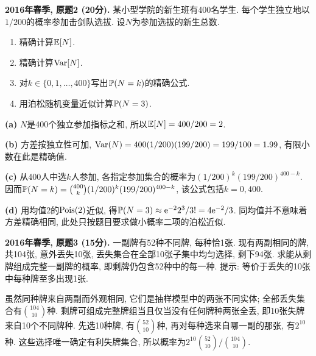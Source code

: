 \begin{exercise}\label{ex:m1-2016s-q2}
\textbf{2016年春季, 原题2 (20分).} 某小型学院的新生班有400名学生. 每个学生独立地以$1/200$的概率参加击剑队选拔. 设$N$为参加选拔的新生总数.
\begin{enumerate}\item[(a)]\label{ex:m1-2016s-q2-a} 精确计算$\mathbb E[N]$.\item[(b)]\label{ex:m1-2016s-q2-b} 精确计算$\operatorname{Var}[N]$.\item[(c)]\label{ex:m1-2016s-q2-c} 对$k\in\{0,1,\ldots,400\}$写出$\mathbb P(N=k)$的精确公式.\item[(d)]\label{ex:m1-2016s-q2-d} 用泊松随机变量近似计算$\mathbb P(N=3)$.\end{enumerate}
\end{exercise}
\begin{solution}
\textbf{(a)}\label{sol:m1-2016s-q2-a} $N$是400个独立参加指标之和, 所以$\mathbb E[N]=400/200=2$.

\textbf{(b)}\label{sol:m1-2016s-q2-b} 方差按独立性可加, $\operatorname{Var}(N)=400(1/200)(199/200)=199/100=1.99$, 有限小数在此是精确值.

\textbf{(c)}\label{sol:m1-2016s-q2-c} 从400人中选$k$人参加, 各指定参加集合的概率为$(1/200)^k(199/200)^{400-k}$. 因而$\mathbb P(N=k)=\binom{400}{k}(1/200)^k(199/200)^{400-k}$, 该公式包括$k=0,400$.

\textbf{(d)}\label{sol:m1-2016s-q2-d} 用均值2的$\operatorname{Pois}(2)$近似, 得$\mathbb P(N=3)\approx\mathrm e^{-2}2^3/3!=4\mathrm e^{-2}/3$. 同均值并不意味着方差精确相同, 此处只按题目要求做小概率二项的泊松近似.
\end{solution}

\begin{exercise}\label{ex:m1-2016s-q3}
\textbf{2016年春季, 原题3 (15分).} 一副牌有52种不同牌, 每种恰1张. 现有两副相同的牌, 共104张, 意外丢失10张, 丢失集合在全部10张子集中均匀选择, 剩下94张. 求能从剩牌组成完整一副牌的概率, 即剩牌仍包含52种中的每一种. 提示: 等价于丢失的10张中每种牌至多出现1张.
\end{exercise}
\begin{solution}
\label{sol:m1-2016s-q3}
虽然同种牌来自两副而外观相同, 它们是抽样模型中的两张不同实体; 全部丢失集合有$\binom{104}{10}$种. 剩牌可组成完整牌组当且仅当没有任何牌种两张全丢, 即10张失牌来自10个不同牌种. 先选10种牌, 有$\binom{52}{10}$种, 再对每种选来自哪一副的那张, 有$2^{10}$种. 这些选择唯一确定有利失牌集合, 所以概率为$2^{10}\binom{52}{10}/\binom{104}{10}$.
\end{solution}


